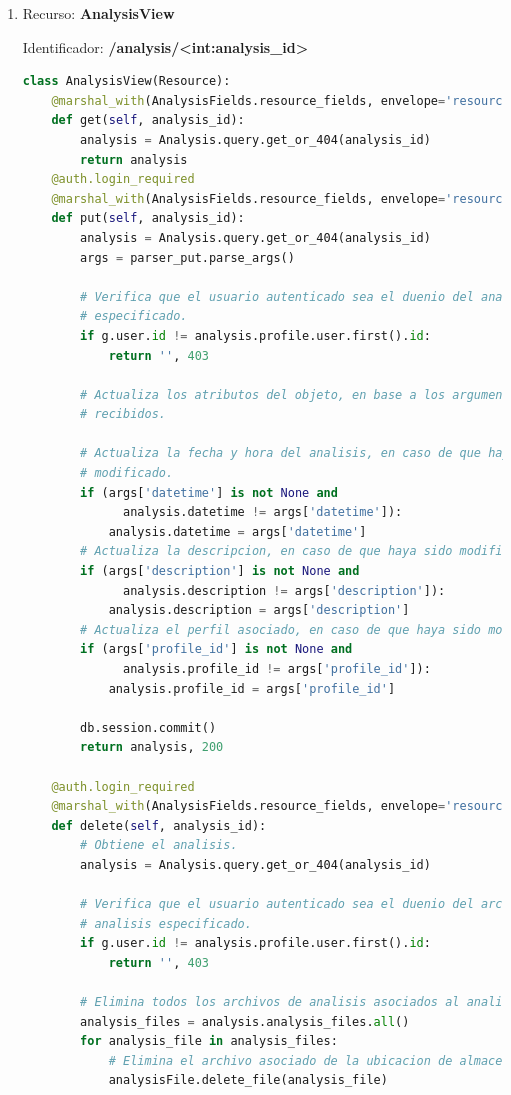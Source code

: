\begin{enumerate}
\item Recurso: \textbf{AnalysisView} 
	
Identificador: \textbf{/analysis/<int:analysis\_id>}
\begin{lstlisting}[language=Python]
class AnalysisView(Resource):
    @marshal_with(AnalysisFields.resource_fields, envelope='resource')
    def get(self, analysis_id):
        analysis = Analysis.query.get_or_404(analysis_id)
        return analysis
    @auth.login_required
    @marshal_with(AnalysisFields.resource_fields, envelope='resource')
    def put(self, analysis_id):
        analysis = Analysis.query.get_or_404(analysis_id)
        args = parser_put.parse_args()

        # Verifica que el usuario autenticado sea el duenio del analisis
        # especificado.
        if g.user.id != analysis.profile.user.first().id:
            return '', 403

        # Actualiza los atributos del objeto, en base a los argumentos
        # recibidos.

        # Actualiza la fecha y hora del analisis, en caso de que haya sido
        # modificado.
        if (args['datetime'] is not None and
              analysis.datetime != args['datetime']):
            analysis.datetime = args['datetime']
        # Actualiza la descripcion, en caso de que haya sido modificada.
        if (args['description'] is not None and
              analysis.description != args['description']):
            analysis.description = args['description']
        # Actualiza el perfil asociado, en caso de que haya sido modificado.
        if (args['profile_id'] is not None and
              analysis.profile_id != args['profile_id']):
            analysis.profile_id = args['profile_id']

        db.session.commit()
        return analysis, 200

    @auth.login_required
    @marshal_with(AnalysisFields.resource_fields, envelope='resource')
    def delete(self, analysis_id):
        # Obtiene el analisis.
        analysis = Analysis.query.get_or_404(analysis_id)

        # Verifica que el usuario autenticado sea el duenio del archivo de
        # analisis especificado.
        if g.user.id != analysis.profile.user.first().id:
            return '', 403

        # Elimina todos los archivos de analisis asociados al analisis.
        analysis_files = analysis.analysis_files.all()
        for analysis_file in analysis_files:
            # Elimina el archivo asociado de la ubicacion de almacenamiento.
            analysisFile.delete_file(analysis_file)


\end{lstlisting}
\end{enumerate}
